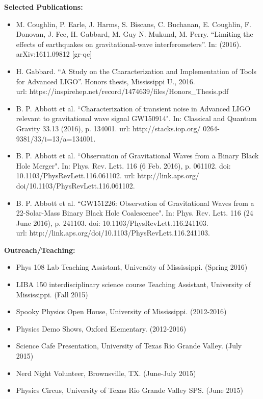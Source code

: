 \documentclass[10pt]{article} %
\begin{document}
\textbf{Selected Publications:}
\begin{itemize}
\item M. Coughlin, P. Earle, J. Harms, S. Biscans, C. Buchanan, E. Coughlin, F. Donovan, J. Fee, H. Gabbard, M. Guy N. Mukund, M. Perry. ``Limiting the effects of earthquakes on gravitational-wave interferometers''. In: (2016). arXiv:1611.09812 [gr-qc]
\item H. Gabbard. ``A Study on the Characterization and Implementation of Tools for Advanced LIGO''. Honors thesis, Mississippi U., 2016. \\ url: https://inspirehep.net/record/1474639/files/Honors\_Thesis.pdf
\item B. P. Abbott et al. ``Characterization of transient noise in Advanced LIGO
relevant to gravitational wave signal GW150914". In: Classical and Quantum Gravity 33.13 (2016), p. 134001. url: http://stacks.iop.org/
0264-9381/33/i=13/a=134001.
\item B. P. Abbott et al. ``Observation of Gravitational Waves from a Binary
Black Hole Merger". In: Phys. Rev. Lett. 116 (6 Feb. 2016), p. 061102.
doi: 10.1103/PhysRevLett.116.061102. url: http://link.aps.org/
doi/10.1103/PhysRevLett.116.061102.
\item B. P. Abbott et al. ``GW151226: Observation of Gravitational Waves from
a 22-Solar-Mass Binary Black Hole Coalescence". In: Phys. Rev. Lett. 116
(24 June 2016), p. 241103. doi: 10.1103/PhysRevLett.116.241103. \\ url:
http://link.aps.org/doi/10.1103/PhysRevLett.116.241103.
\end{itemize}

\textbf{Outreach/Teaching:}
\begin{itemize}

\item Phys 108 Lab Teaching Assistant, University of Mississippi. (Spring 2016)
\item LIBA 150 interdisciplinary science course Teaching Assistant, University of Mississippi. (Fall 2015)
\item Spooky Physics Open House, University of Mississippi. (2012-2016) 
\item Physics Demo Shows, Oxford Elementary. (2012-2016)
\item Science Cafe Presentation, University of Texas Rio Grande Valley. (July 2015)
\item Nerd Night Volunteer, Brownsville, TX. (June-July 2015)
\item Physics Circus, University of Texas Rio Grande Valley SPS. (June 2015)
\end{itemize}
\end{document}
